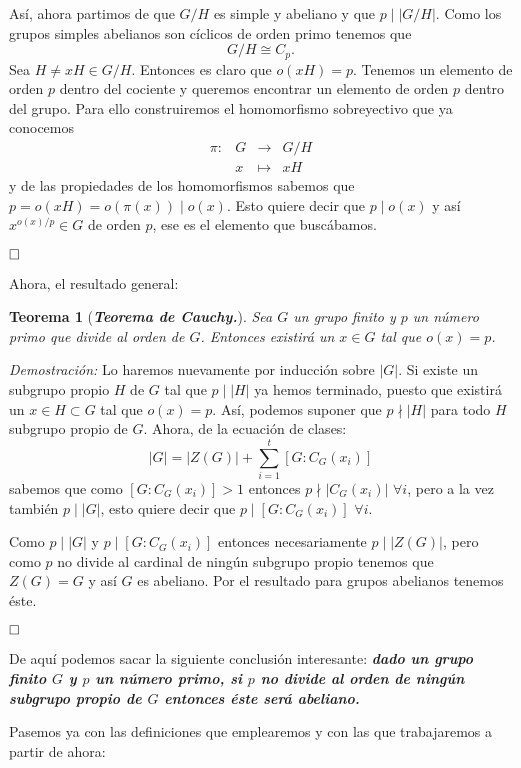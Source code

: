 \documentclass[12pt]{article}
\newtheorem{theorem}{Teorema}[section]
\begin{document}
Así, ahora partimos de que $G/H$ es simple y abeliano y que  $p \mid |G/H|$. Como los grupos simples abelianos son cíclicos de orden primo tenemos que $$G/H \cong C_{p}.$$ Sea $H \neq xH \in G/H$. Entonces es claro que $o(xH) = p$. Tenemos un elemento de orden $p$ dentro del cociente y queremos encontrar un elemento de orden $p$ dentro del grupo. Para ello construiremos el homomorfismo sobreyectivo que ya conocemos $$\begin{array}{rccl}
\pi \colon &G & \longrightarrow & G/H\\
&x & \longmapsto &xH
\end{array}
$$ y de las propiedades de los homomorfismos sabemos que $p = o(xH) = o(\pi(x)) \mid o(x)$. Esto quiere decir que $p \mid o(x)$ y así $x^{o(x)/p} \in G$ de orden $p$, ese es el elemento que buscábamos.

$\hfill \square$

Ahora, el resultado general:

\begin{theorem}[\textbf{\textit{Teorema de Cauchy.}}]
Sea $G$ un grupo finito y $p$ un número primo que divide al orden de $G$. Entonces existirá un $x \in G$ tal que $o(x) = p$.
\end{theorem}
\emph{Demostración: } Lo haremos nuevamente por inducción sobre $|G|$. Si existe un subgrupo propio $H$ de $G$ tal que $p \mid |H|$ ya hemos terminado, puesto que existirá un $x \in H \subset G$ tal que $o(x) = p$. Así, podemos suponer que $p \nmid |H|$ para todo $H$ subgrupo propio de $G$. Ahora, de la ecuación de clases: $$|G| = |Z(G)| + \sum_{i = 1}^{t}  \left[ G:C_{G}(x_{i}) \right]$$ sabemos que como $\left[ G:C_{G}(x_{i}) \right]>1$ entonces $p \nmid |C_{G}(x_{i})|$ $\forall i$, pero a la vez también $p \mid |G|$, esto quiere decir que $p \mid  \left[ G:C_{G}(x_{i}) \right]$ $\forall i$.

Como $p \mid |G|$ y $p \mid  \left[ G:C_{G}(x_{i}) \right]$ entonces necesariamente $p \mid |Z(G)|$, pero como $p$ no divide al cardinal de ningún subgrupo propio tenemos que $Z(G) = G$ y así $G$ es abeliano. Por el resultado para grupos abelianos tenemos éste.

$\hfill \square$

De aquí podemos sacar la siguiente conclusión interesante: \textbf{\textit{dado un grupo finito $G$ y $p$ un número primo, si $p$ no divide al orden de ningún subgrupo propio de $G$ entonces éste será abeliano.}}

Pasemos ya con las definiciones que emplearemos y con las que trabajaremos a partir de ahora:
\end{document}

